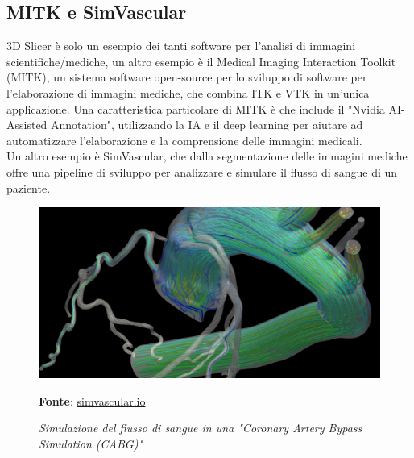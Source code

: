 \subsection{MITK e SimVascular}
3D Slicer è solo un esempio dei tanti software per l'analisi di immagini scientifiche/mediche, un altro esempio è il Medical Imaging Interaction Toolkit (MITK), un sistema software open-source per lo sviluppo di software per l'elaborazione di immagini mediche, che combina ITK e VTK in un'unica applicazione. Una caratteristica particolare di MITK è che include il "Nvidia AI-Assisted Annotation", utilizzando la IA e il deep learning per aiutare ad automatizzare l'elaborazione e la comprensione delle immagini medicali.
\\
Un altro esempio è SimVascular, che dalla segmentazione delle immagini mediche offre una pipeline di sviluppo per analizzare e simulare il flusso di sangue di un paziente.
\begin{figure}[h]
    \centering
    \includegraphics[scale=0.15]{immagini/volumerendering/simvascular.png}
    \caption{\textit{Simulazione del flusso di sangue in una "Coronary Artery Bypass Simulation (CABG)"}}
    \textbf{Fonte}: \href{http://simvascular.github.io/}{simvascular.io}
    \label{fig: SimVascular}
\end{figure}


